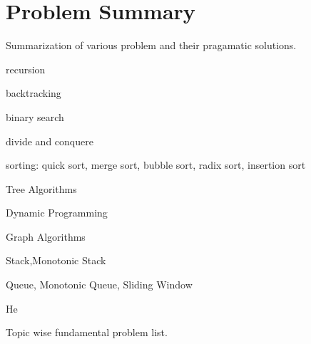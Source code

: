 \chapter{Problem Summary}{\label{summary}}

Summarization of various problem and their pragamatic solutions.
\begin{compactenum}
    \item recursion 
    \item backtracking
    \item binary search
    \item divide and conquere
    \item sorting: quick sort, merge sort, bubble sort, radix sort, insertion sort
    \item Tree Algorithms
    \item  Dynamic Programming
    \item Graph Algorithms
    \item Stack,Monotonic Stack
    \item Queue, Monotonic Queue, Sliding Window
    \item He
\end{compactenum}

Topic wise fundamental problem list.

